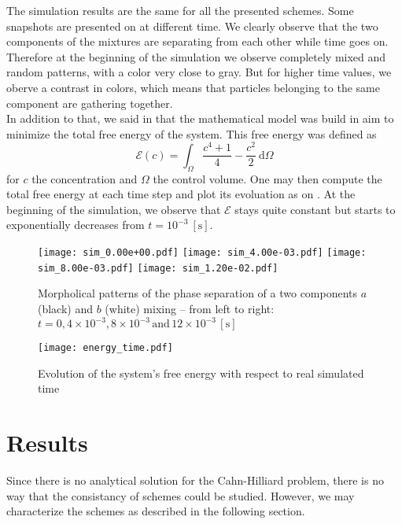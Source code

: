 \documentclass[10pt,a4paper,twocolumn]{article}
\begin{document}
The simulation results are the same for all the presented schemes. Some snapshots are presented on  at different time. We clearly observe that the two components of the mixtures are separating from each other while time goes on. Therefore at the beginning of the simulation we observe completely mixed and random patterns, with a color very close to gray. But for higher time values, we oberve a contrast in colors, which means that particles belonging to the same component are gathering together.
\vspace{\baselineskip}\\
In addition to that, we said in  that the mathematical model was build in aim to minimize the total free energy of the system. This free energy was defined as
\begin{equation}
	\mathcal E(c) = \int_\Omega \frac{c^4 + 1}{4} - \frac{c^2}{2}\ \mathrm{d}\Omega
\end{equation}
for $c$ the concentration and $\Omega$ the control volume. One may then compute the total free energy at each time step and plot its evoluation as on . At the beginning of the simulation, we observe that $\mathcal E$ stays quite constant but starts to exponentially decreases from $t = 10^{-3}\ [\mathrm{s}]$.
\begin{figure*}
	\centering
	\texttt{[image: sim\_0.00e+00.pdf]}
	\texttt{[image: sim\_4.00e-03.pdf]}
	\texttt{[image: sim\_8.00e-03.pdf]}
	\texttt{[image: sim\_1.20e-02.pdf]}
	\caption{Morpholical patterns of the phase separation of a two components $a$ (black) and $b$ (white) mixing -- from left to right: $t = 0, 4\times10^{-3}, 8\times10^{-3}\,\text{and}\, 12\times10^{-3}\, [\mathrm{s}]$}
	\label{fig:snapshots}
\end{figure*}
\begin{figure}
	\centering
	\texttt{[image: energy\_time.pdf]}
	\caption{Evolution of the system's free energy with respect to real simulated time}
	\label{fig:energy_time}
\end{figure}

\section{Results} %
\label{sec:results}

Since there is no analytical solution for the Cahn-Hilliard problem, there is no way that the consistancy of schemes could be studied. However, we may characterize the schemes as described in the following section.
\end{document}
